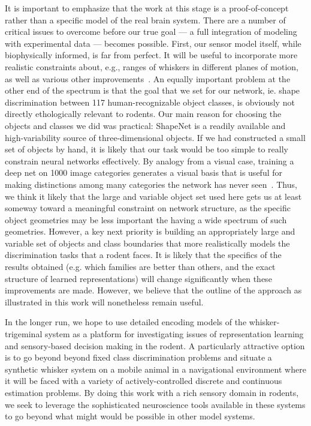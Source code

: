 It is important to emphasize that the work at this stage is a proof-of-concept rather than a specific model of the real brain system.  
There are a number of critical issues to overcome before our true goal --- a full integration of modeling with experimental data --- becomes possible.    
First, our sensor model itself, while biophysically informed, is far from perfect. 
It will be useful to incorporate more realistic constraints about, e.g., ranges of whiskers in different planes of motion, as well as various other improvements~\cite{Quist2014, Huet2016}.
An equally important problem at the other end of the spectrum is that the goal that we set for our network, ie. shape discrimination between 117 human-recognizable object classes, is obviously not directly ethologically relevant to rodents. 
Our main reason for choosing the objects and classes we did was practical: ShapeNet is a readily available and high-variability source of three-dimensional objects. 
If we had constructed a small set of objects by hand, it is likely that our task would be too simple to really constrain neural networks effectively. 
By analogy from a visual case, training a deep net on 1000 image categories generates a visual basis that is useful for making distinctions among many categories the network has never seen~\cite{Yamins2014,cadieu2014deep,razavian2014cnn}.
Thus, we think it likely that the large and variable object set used here gets us at least someway toward a meaningful constraint on network structure, as the specific object geometries may be less important the having a wide spectrum of such geometries. 
However, a key next priority is building an appropriately large and variable set of objects and class boundaries that more realistically models the discrimination tasks that a rodent faces.
It is likely that the specifics of the results obtained (e.g. which families are better than others, and the exact structure of learned representations) will change significantly when these improvements are made.  
However, we believe that the outline of the approach as illustrated in this work will nonetheless remain useful. 

In the longer run, we hope to use detailed encoding models of the whisker-trigeminal system as a platform for investigating issues of representation learning and sensory-based decision making in the rodent. 
A particularly attractive option is to go beyond beyond fixed class discrimination problems and situate a synthetic whisker system on a mobile animal in a navigational environment where it will be faced with a variety of actively-controlled discrete and continuous estimation problems.
By doing this work with a rich sensory domain in rodents, we seek to leverage the sophisticated neuroscience tools available in these systems to go beyond what might would be possible in other model systems.  

